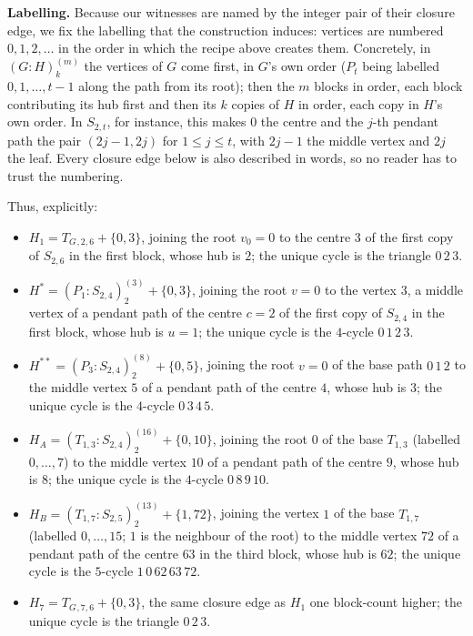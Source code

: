 \documentclass[11pt]{amsart}
\theoremstyle{definition}
\theoremstyle{remark}
\newcommand{\TG}{T_{G}}
\begin{document}
\medskip
\noindent\textbf{Labelling.} Because our witnesses are named by the integer pair of
their closure edge, we fix the labelling that the construction induces: vertices are
numbered $0,1,2,\dots$ in the order in which the recipe
above creates them. Concretely, in $(G:H)_k^{(m)}$ the vertices of $G$ come first, in
$G$'s own order ($P_t$ being labelled $0,1,\dots,t-1$ along the path from its root);
then the $m$ blocks in order, each block contributing its hub first and then its $k$
copies of $H$ in order, each copy in $H$'s own order. In $S_{2,t}$, for instance, this
makes $0$ the centre and the $j$-th pendant path the pair $(2j-1,2j)$ for
$1\le j\le t$, with $2j-1$ the middle vertex and $2j$ the leaf. Every closure edge
below is also described in words, so no reader has to trust the numbering.

\medskip
\noindent Thus, explicitly:
\begin{itemize}
\item $H_1=\TG{}_{,2,6}+\{0,3\}$, joining the root $v_0=0$ to the centre $3$ of the
      first copy of $S_{2,6}$ in the first block, whose hub is $2$; the unique cycle
      is the triangle $0\,2\,3$.
\item $H^*=(P_1:S_{2,4})_2^{(3)}+\{0,3\}$, joining the root $v=0$ to the vertex $3$,
      a middle vertex of a pendant path of the centre $c=2$ of the first copy of
      $S_{2,4}$ in the first block, whose hub is $u=1$; the unique cycle is the
      $4$-cycle $0\,1\,2\,3$.
\item $H^{**}=(P_3:S_{2,4})_2^{(8)}+\{0,5\}$, joining the root $v=0$ of the base path
      $0\,1\,2$ to the middle vertex $5$ of a pendant path of the centre $4$, whose
      hub is $3$; the unique cycle is the $4$-cycle $0\,3\,4\,5$.
\item $H_A=(T_{1,3}:S_{2,4})_2^{(16)}+\{0,10\}$, joining the root $0$ of the base
      $T_{1,3}$ (labelled $0,\dots,7$) to the middle vertex $10$ of a pendant path of
      the centre $9$, whose hub is $8$; the unique cycle is the $4$-cycle
      $0\,8\,9\,10$.
\item $H_B=(T_{1,7}:S_{2,5})_2^{(13)}+\{1,72\}$, joining the vertex $1$ of the base
      $T_{1,7}$ (labelled $0,\dots,15$; $1$ is the neighbour of the root) to the
      middle vertex $72$ of a pendant path of the centre $63$ in the third block,
      whose hub is $62$; the unique cycle is the $5$-cycle $1\,0\,62\,63\,72$.
\item $H_7=\TG{}_{,7,6}+\{0,3\}$, the same closure edge as $H_1$ one block-count
      higher; the unique cycle is the triangle $0\,2\,3$.
\end{itemize}
\end{document}
